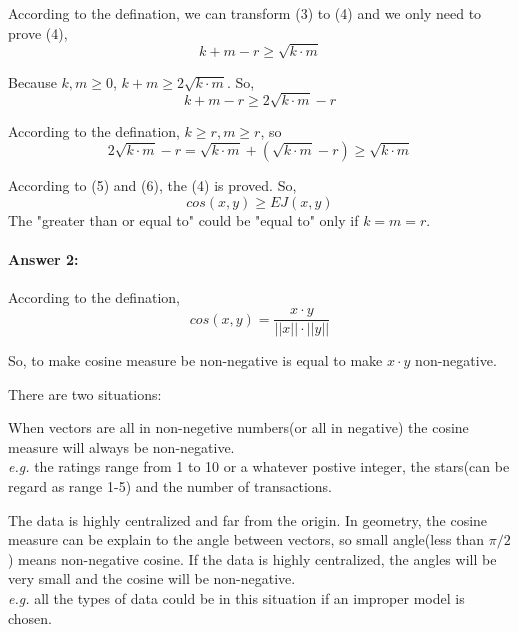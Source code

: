 \documentclass{article}
\begin{document}
{{        According to the defination, we can transform (3) to (4) and we only need to prove (4),
        \begin{equation}
            k + m - r \geqslant \sqrt{k\cdot m}
        \end{equation}

        Because \(k, m\geqslant 0\), \(k + m \geqslant 2 \sqrt{k\cdot m}\). So, 
        \begin{equation}
            k + m - r \geqslant 2\sqrt{k\cdot m} - r
        \end{equation}

        According to the defination, \(k\geqslant r, m\geqslant r\), so 
        \begin{equation}
            2\sqrt{k\cdot m} - r = \sqrt{k\cdot m} + (\sqrt{k\cdot m} - r) \geqslant \sqrt{k\cdot m}
        \end{equation}

        According to (5) and (6), the (4) is proved. So,
        \[cos(x,y) \geqslant \mathit{EJ}(x,y)\]
        The "greater than or equal to" could be "equal to" only if \(k = m = r\).
    }

    \paragraph{Answer 2: }{
        According to the defination,
        \[cos(x,y) = \frac{x\cdot y}{\lvert\lvert x\rvert\rvert \cdot \lvert\lvert y\rvert\rvert}\]
        
        So, to make cosine measure be non-negative is equal to make \(x\cdot y\) non-negative. 

        There are two situations:
        \begin{enumerate}{
            \item When vectors are all in non-negetive numbers(or all in negative) the cosine measure will always be non-negative.\\
            \textit{e.g.} the ratings range from 1 to 10 or a whatever postive integer, the stars(can be regard as range 1-5) and the number of transactions.
            \item The data is highly centralized and far from the origin. In geometry, the cosine measure can be explain to the angle between vectors, so small angle(less than \(\pi/2\)) means non-negative cosine. If the data is highly centralized, the angles will be very small and the cosine will be non-negative.\\
            \textit{e.g.} all the types of data could be in this situation if an improper model is chosen.
        }
        \end{enumerate} 
    }
}
\end{document}
